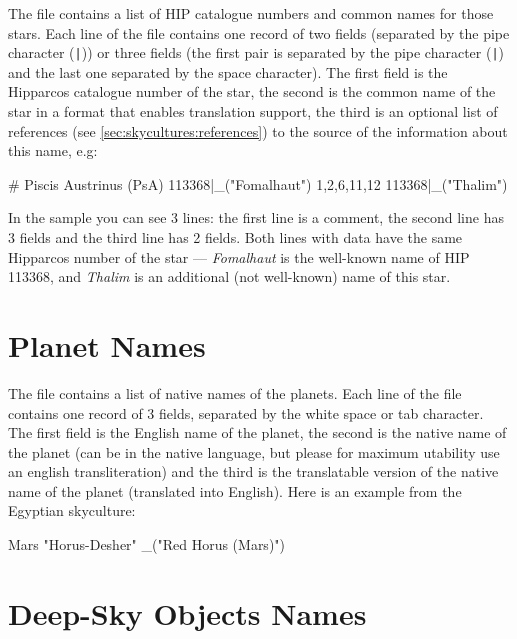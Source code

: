 The file  contains a list of HIP catalogue
numbers and common names for those stars. Each line of the file
contains one record of two fields (separated by the pipe character
(\texttt{|})) or three fields (the first pair is separated by the 
pipe character (\texttt{|}) and the last one separated by the space 
character). The first field is the Hipparcos catalogue number of the
star, the second is the common name of the star in a format that enables
translation support, the third is an optional list of references (see \ref{sec:skycultures:references})  
to the source of the information about this name, e.g:
\begin{configfile}
# Piscis Austrinus (PsA)
113368|_("Fomalhaut") 1,2,6,11,12
113368|_("Thalim")
\end{configfile}

In the sample you can see 3 lines: the first line is a comment, the 
second line has 3 fields and the third line has 2 fields. Both lines 
with data have the same Hipparcos number of the star --- \textit{Fomalhaut} is 
the well-known name of HIP 113368, and \textit{Thalim} is an additional 
(not well-known) name of this star.

\section{Planet Names}
\label{sec:skycultures:planetnames}

The file  contains a list of native names of
the planets. Each line of the file contains one record of 3 fields,
separated by the white space or tab character. The first field is the
English name of the planet, the second is the native name of the
planet (can be in the native language, but please for maximum
utability use an english transliteration) and the third is the
translatable version of the native name of the planet (translated into
English). Here is an example from the Egyptian skyculture:

\begin{configfile}
Mars	"Horus-Desher"	_("Red Horus (Mars)")
\end{configfile}

\section{Deep-Sky Objects Names}
\label{sec:skycultures:dsonames}


